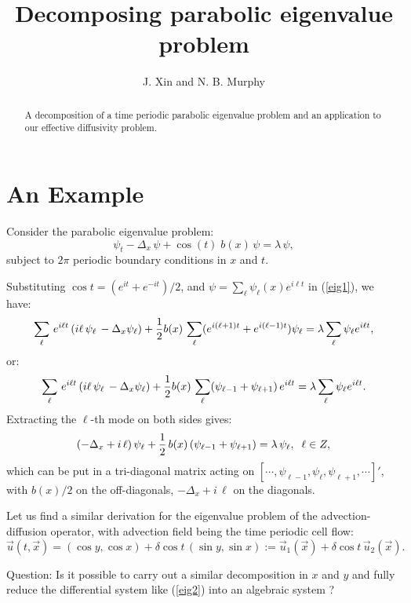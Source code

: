 \documentclass{article}
\newcommand{\no}{\nonumber}
\newcommand{\be}{\begin{equation}}
\newcommand{\ee}{\end{equation}}
\newcommand{\lam}{\mbox{$\lambda$}}
\newcommand{\0}{\mathbf{0}}
\newcommand{\1}{\mathbf{1}}
\newcommand{\2}{\mathbf{2}}
\newcommand{\3}{\mathbf{3}}
\newcommand{\4}{\mathbf{4}}
\newcommand{\5}{\mathbf{5}}
\newcommand{\6}{\mathbf{6}}
\newcommand{\7}{\mathbf{7}}
\newcommand{\8}{\mathbf{8}}
\begin{document}
\title{Decomposing parabolic eigenvalue problem}
\author{J. Xin and N. B. Murphy }
\date{}
\maketitle
\begin{abstract}
A decomposition of a time periodic parabolic eigenvalue problem and an
application to our effective diffusivity problem.

\end{abstract}
\bigskip
 
\section{An Example}
Consider the parabolic eigenvalue problem:
\be
\psi_t -\Delta_x \, \psi + \cos (t) \; b(x) \, \psi = \lam \, \psi, \label{eig1}
\ee
subject to $2\pi$ periodic boundary conditions in $x$ and $t$. 
\medskip

Substituting $\cos t = (e^{it} + e^{-it})/2$, and $\psi = \sum_{\ell} \psi_\ell (x) e^{i \ell t}$ in (\ref{eig1}), 
we have:
\be
\sum_\ell \,e^{i\ell t}\, (i \ell \, \psi_\ell\, - \Delta_x \psi_\ell) + {1\over 2} b(x)\, \sum_{\ell} (e^{i(\ell+1)t} + e^{i(\ell-1) t}) \psi_\ell 
= \lam \sum_\ell \psi_\ell e^{i\ell t}, \no
\ee
or:
\be
 \sum_\ell \,e^{i\ell t}\, (i \ell \, \psi_\ell\, - \Delta_x \psi_\ell)  + {1\over 2} b(x)\, \sum_{\ell} (\psi_{\ell-1} + \psi_{\ell+1}) \, e^{i\ell t} 
= \lam \sum_\ell \psi_\ell e^{i\ell t}. \no
\ee
Extracting the $\ell$-th mode on both sides gives:
\be
(-\Delta_x + i\, \ell)\, \psi_\ell +{1\over 2} \, b(x)\, (\psi_{\ell-1} + \psi_{\ell+1}) = \lam \, \psi_\ell, \;\; \ell \in Z, \label{eig2}
\ee
which can be put in a tri-diagonal matrix acting on $[\cdots, \psi_{\ell-1}, \psi_\ell, \psi_{\ell+1}, \cdots ]'$,
  with $b(x)/2$ on the off-diagonals, 
$-\Delta_x + i\, \ell $ on the diagonals.

Let us find a similar derivation for the eigenvalue problem of the 
advection-diffusion operator, with advection field being the time periodic cell flow:
\be \label{eig3}
\vec{u}(t,\vec{x})%
       =(\cos y,\cos x)+\delta\cos t \,(\sin y,\sin x)
       :=\vec{u}_1(\vec{x})+\delta\cos{t}\,\vec{u}_2(\vec{x}). 
\ee

Question: Is it possible to carry out a similar decomposition in $x$
and $y$ and fully reduce the  
differential system like (\ref{eig2}) into an algebraic system ?

%
\end{document}
